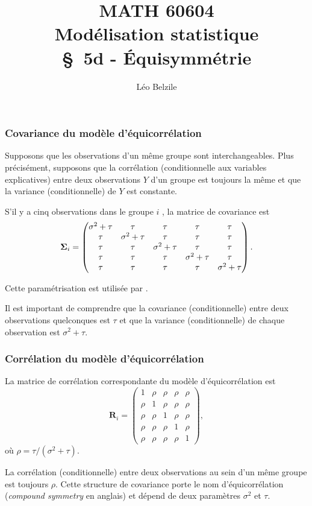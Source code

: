 \documentclass{beamer}
\title[\color{white}{MATH 60604 \S~5d - Équisymmétrie}]{\texorpdfstring{MATH 60604 \\Modélisation statistique \\ \S~5d - Équisymmétrie}{MATH 60604 \\Modélisation statistique \\ \S~5d - Équisymmétrie}}
\author{Léo Belzile}
\institute{HEC Montréal\\
Département de sciences de la décision}
\date{}
\begin{document}
\frame{\titlepage}

\begin{frame}
\frametitle{Covariance du modèle d'équicorrélation}
\bi
\item Supposons que les
observations d'un même groupe sont interchangeables. Plus précisément, 
supposons que la corrélation (conditionnelle aux variables explicatives) entre
deux observations $Y$ d'un groupe est toujours la même et que la variance (conditionnelle) de $Y$ est constante.
\item S'il y a cinq observations dans le groupe $i$ , la matrice de covariance est
{\small \[
\boldsymbol {\Sigma}_i=
  \begin{pmatrix}
    \sigma^2+\tau & \tau & \tau & \tau & \tau\\
    \tau & \sigma^2+\tau & \tau& \tau & \tau\\
    \tau & \tau & \sigma^2+\tau & \tau & \tau\\
    \tau & \tau & \tau & \sigma^2+\tau & \tau\\
    \tau & \tau & \tau & \tau & \sigma^2+\tau
  \end{pmatrix}.
\]
}
\item Cette paramétrisation est utilisée par \SASlang{}. 
\item Il est important de comprendre que la covariance
(conditionnelle) entre deux observations quelconques est $\tau$ et que la
variance (conditionnelle) de chaque observation est $\sigma^2+\tau$.
\ei
\end{frame}

\begin{frame}
\frametitle{Corrélation du modèle d'équicorrélation}
La matrice de corrélation correspondante du modèle d'équicorrélation est
\[
\mathbf{R}_i=
  \begin{pmatrix}
   1 & \rho & \rho & \rho & \rho\\
    \rho &1 & \rho & \rho & \rho\\
   \rho & \rho & 1 &\rho & \rho\\
   \rho & \rho & \rho & 1 &\rho\\
   \rho & \rho & \rho & \rho &1
  \end{pmatrix}, 
\]
où $\rho=\tau/(\sigma^2+\tau)$.
\bi
\item La corrélation (conditionnelle) entre deux observations
au sein d'un même groupe est toujours $\rho$. 
Cette structure
de covariance porte le nom \alert{d'équicorrélation} (\textit{compound symmetry} en anglais) et dépend de deux paramètres $\sigma^2$ et $\tau$.
\ei
\end{frame}
\end{document}
